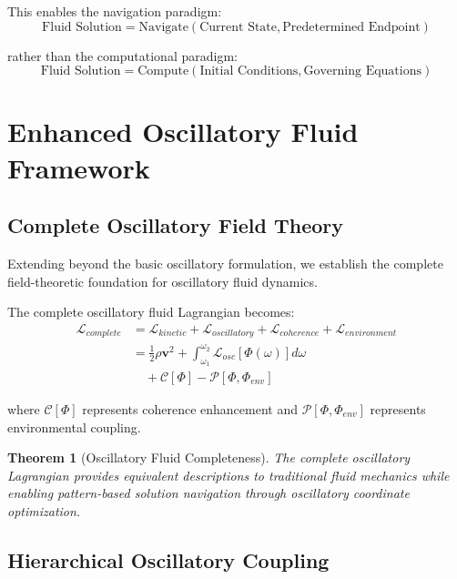 \documentclass[12pt,a4paper]{article}
\newtheorem{theorem}{Theorem}
\begin{document}
This enables the navigation paradigm:
\begin{equation}
\text{Fluid Solution} = \text{Navigate}(\text{Current State}, \text{Predetermined Endpoint})
\end{equation}

rather than the computational paradigm:
\begin{equation}
\text{Fluid Solution} = \text{Compute}(\text{Initial Conditions}, \text{Governing Equations})
\end{equation}

\section{Enhanced Oscillatory Fluid Framework}

\subsection{Complete Oscillatory Field Theory}

Extending beyond the basic oscillatory formulation, we establish the complete field-theoretic foundation for oscillatory fluid dynamics.

The complete oscillatory fluid Lagrangian becomes:
\begin{align}
\mathcal{L}_{complete} &= \mathcal{L}_{kinetic} + \mathcal{L}_{oscillatory} + \mathcal{L}_{coherence} + \mathcal{L}_{environment} \\
&= \frac{1}{2}\rho \mathbf{v}^2 + \int_{\omega_1}^{\omega_2} \mathcal{L}_{osc}[\Phi(\omega)] d\omega \\
&\quad + \mathcal{C}[\Phi] - \mathcal{P}[\Phi, \Phi_{env}]
\end{align}

where $\mathcal{C}[\Phi]$ represents coherence enhancement and $\mathcal{P}[\Phi, \Phi_{env}]$ represents environmental coupling.

\begin{theorem}[Oscillatory Fluid Completeness]
The complete oscillatory Lagrangian provides equivalent descriptions to traditional fluid mechanics while enabling pattern-based solution navigation through oscillatory coordinate optimization.
\end{theorem}

\subsection{Hierarchical Oscillatory Coupling}
\end{document}
